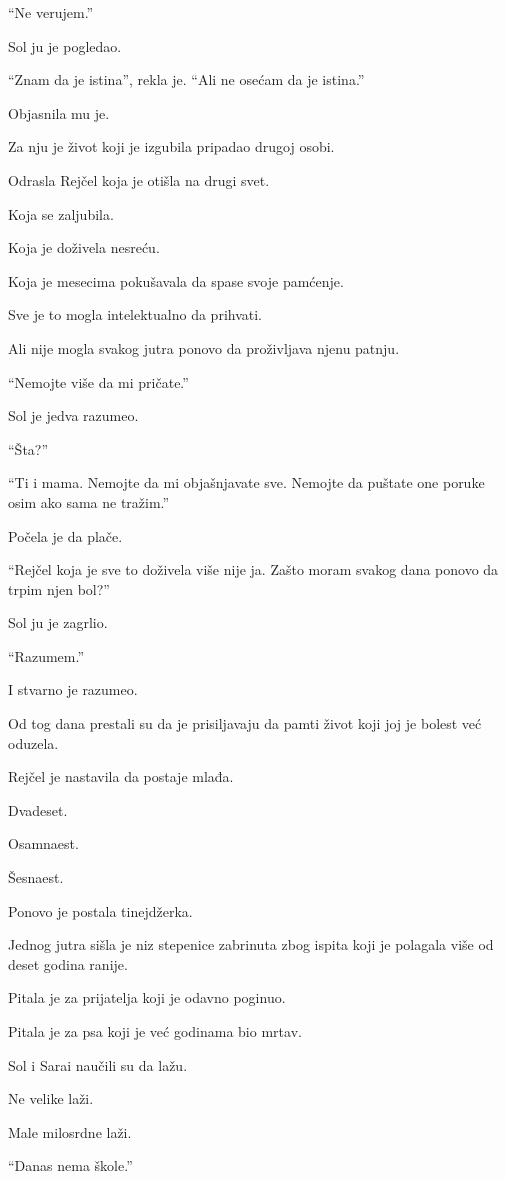 ``Ne verujem.''

Sol ju je pogledao.

``Znam da je istina'', rekla je. ``Ali ne osećam da je istina.''

Objasnila mu je.

Za nju je život koji je izgubila pripadao drugoj osobi.

Odrasla Rejčel koja je otišla na drugi svet.

Koja se zaljubila.

Koja je doživela nesreću.

Koja je mesecima pokušavala da spase svoje pamćenje.

Sve je to mogla intelektualno da prihvati.

Ali nije mogla svakog jutra ponovo da proživljava njenu patnju.

``Nemojte više da mi pričate.''

Sol je jedva razumeo.

``Šta?''

``Ti i mama. Nemojte da mi objašnjavate sve. Nemojte da puštate one poruke osim ako sama ne tražim.''

Počela je da plače.

``Rejčel koja je sve to doživela više nije ja. Zašto moram svakog dana ponovo da trpim njen bol?''

Sol ju je zagrlio.

``Razumem.''

I stvarno je razumeo.

Od tog dana prestali su da je prisiljavaju da pamti život koji joj je bolest već oduzela.

\bigskip

Rejčel je nastavila da postaje mlađa.

Dvadeset.

Osamnaest.

Šesnaest.

Ponovo je postala tinejdžerka.

Jednog jutra sišla je niz stepenice zabrinuta zbog ispita koji je polagala više od deset godina ranije.

Pitala je za prijatelja koji je odavno poginuo.

Pitala je za psa koji je već godinama bio mrtav.

Sol i Sarai naučili su da lažu.

Ne velike laži.

Male milosrdne laži.

``Danas nema škole.''

